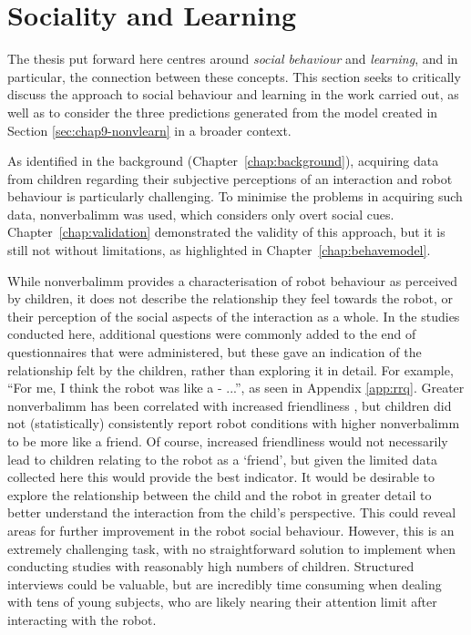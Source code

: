 \section{Sociality and Learning} \label{sec:ch10-social}
The thesis put forward here centres around \textit{social behaviour} and \textit{\gls{learning}}, and in particular, the connection between these concepts. This section seeks to critically discuss the approach to social behaviour and \gls{learning} in the work carried out, as well as to consider the three predictions generated from the model created in Section \ref{sec:chap9-nonvlearn} in a broader context.

As identified in the background (Chapter~\ref{chap:background}), acquiring data from children regarding their subjective perceptions of an interaction and robot behaviour is particularly challenging. To minimise the problems in acquiring such data, \gls{nonverbalimm} was used, which considers only overt social cues. Chapter~\ref{chap:validation} demonstrated the validity of this approach, but it is still not without limitations, as highlighted in Chapter~\ref{chap:behavemodel}.

While \gls{nonverbalimm} provides a characterisation of robot behaviour as perceived by children, it does not describe the relationship they feel towards the robot, or their perception of the social aspects of the interaction as a whole. In the studies conducted here, additional questions were commonly added to the end of questionnaires that were administered, but these gave an indication of the relationship felt by the children, rather than exploring it in detail. For example, ``For me, I think the robot was like a - ...'', as seen in Appendix \ref{app:rrq}. Greater \gls{nonverbalimm} has been correlated with increased friendliness \citep{wilson2007immediacy}, but children did not (statistically) consistently report robot conditions with higher \gls{nonverbalimm} to be more like a friend. Of course, increased friendliness would not necessarily lead to children relating to the robot as a `friend', but given the limited data collected here this would provide the best indicator. It would be desirable to explore the relationship between the child and the robot in greater detail to better understand the interaction from the child's perspective. This could reveal areas for further improvement in the robot social behaviour. However, this is an extremely challenging task, with no straightforward solution to implement when conducting studies with reasonably high numbers of children. Structured interviews could be valuable, but are incredibly time consuming when dealing with tens of young subjects, who are likely nearing their attention limit after interacting with the robot.

